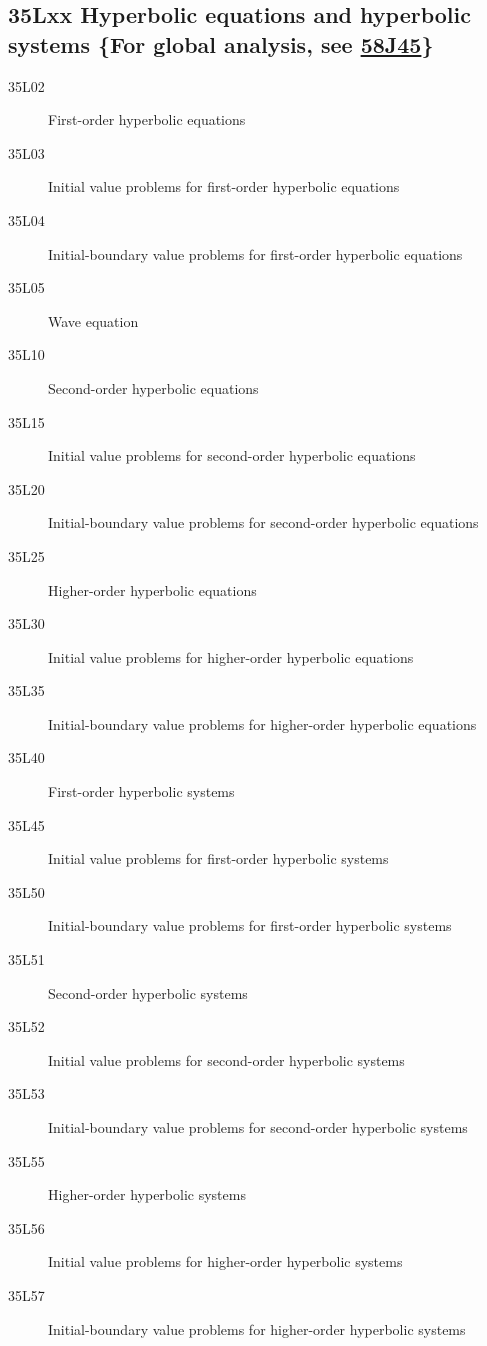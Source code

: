 \documentclass[letterpaper]{article}
\begin{document}
\subsection*{35Lxx  Hyperbolic  equations and hyperbolic systems  \{For global analysis, see \hyperref[58J45]{58J45}\} }\label{35Lxx}
\begin{description}  
\item [35L02]\label{35L02} First-order hyperbolic equations
\item [35L03]\label{35L03} Initial value problems for first-order hyperbolic equations
\item [35L04]\label{35L04} Initial-boundary value problems for first-order hyperbolic equations
\item [35L05]\label{35L05} Wave equation
\item [35L10]\label{35L10} Second-order hyperbolic equations
\item [35L15]\label{35L15} Initial value problems for second-order hyperbolic equations
\item [35L20]\label{35L20} Initial-boundary value problems for second-order hyperbolic equations
\item [35L25]\label{35L25} Higher-order hyperbolic equations
\item [35L30]\label{35L30} Initial value problems for higher-order hyperbolic equations
\item [35L35]\label{35L35} Initial-boundary value problems for higher-order hyperbolic equations
\item [35L40]\label{35L40} First-order hyperbolic systems  
\item [35L45]\label{35L45} Initial value problems for first-order hyperbolic systems
\item [35L50]\label{35L50} Initial-boundary value problems for first-order hyperbolic systems
\item [35L51]\label{35L51} Second-order hyperbolic systems 
\item [35L52]\label{35L52} Initial value problems for second-order hyperbolic systems 
\item [35L53]\label{35L53} Initial-boundary value problems for second-order hyperbolic systems 
\item [35L55]\label{35L55} Higher-order hyperbolic systems 
\item [35L56]\label{35L56} Initial value problems for higher-order hyperbolic systems 
\item [35L57]\label{35L57} Initial-boundary value problems for higher-order hyperbolic systems 

\end{description}
\end{document}
